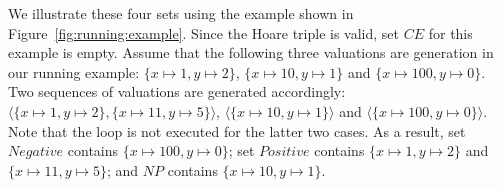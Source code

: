 %
%
\begin{example}
We illustrate these four sets using the example shown in Figure~\ref{fig:running:example}. Since the Hoare triple is valid, set $CE$ for this example is empty. 
Assume that the following three valuations are generation in our running example: $\{x \mapsto 1, y \mapsto 2\}$, $\{x \mapsto 10, y \mapsto 1\}$ and $\{x \mapsto 100, y \mapsto 0\}$. Two sequences of valuations are generated accordingly: $\langle \{x \mapsto 1, y \mapsto 2\}, \{x \mapsto 11, y \mapsto 5\} \rangle$, $\langle \{x \mapsto 10, y \mapsto 1\} \rangle$ and $\langle \{x \mapsto 100, y \mapsto 0\} \rangle$. Note that the loop is not executed for the latter two cases. As a result, set $\mathit{Negative}$ contains $\{x \mapsto 100, y \mapsto 0\}$; set $\mathit{Positive}$ contains $\{x \mapsto 1, y \mapsto 2\}$ and $\{x \mapsto 11, y \mapsto 5\}$; and $\mathit{NP}$ contains $\{x \mapsto 10, y \mapsto 1\}$.
\end{example}
